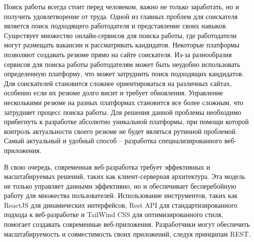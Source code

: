 \documentclass[master, och, diploma]{SCWorks}
\begin{document}
\maketitle

\secNumbering

\tableofcontents







\intro
Поиск работы всегда стоит перед человеком, важно не только заработать, но и получить удовлетворение от труда. Одной из главных проблем для соискателя является поиск подходящего работодателя и представление своих навыков. Существует множество онлайн-сервисов для поиска работы, где работодатели могут размещать вакансии и рассматривать кандидатов. Некоторые платформы позволяют создавать резюме прямо на сайте соискателя. Из-за разнообразия сервисов для поиска работы работодателям может быть неудобно использовать определенную платформу, что может затруднить поиск подходящих кандидатов. Для соискателей становится сложнее ориентироваться на различных сайтах, особенно если их резюме долго висит и требует обновления. Управление несколькими резюме на разных платформах становится все более сложным, что затрудняет процесс поиска работы. Для решения данной проблемы необходимо прибегнуть к разработке абсолютно уникальной платформы, при помощи которой контроль актуальности своего резюме не будет являться рутинной проблемой. Самый актуальный и удобный способ -- разработка специализированного веб-приложения.

В свою очередь, современная веб-разработка требует эффективных и масштабируемых решений, таких как клиент-серверная архитектура. Эта модель не только управляет данными эффективно, но и обеспечивает бесперебойную работу для множества пользователей. Использование инструментов, таких как ReactJS для динамических интерфейсов, Rest API для стандартизированного подхода к веб-разработке и TailWind CSS для оптимизированного стиля, помогает создавать современные веб-приложения. Разработчики могут обеспечить масштабируемость и совместимость своих приложений, следуя принципам REST.
\end{document}
